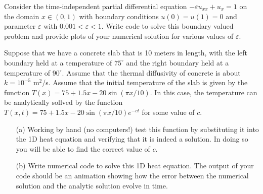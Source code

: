

\begin{problem}
    Consider the time-independent partial differential equation $-\varepsilon u_{xx} +
    u_x = 1$ on the domain $x \in (0,1)$ with boundary conditions $u(0) = u(1) = 0$ and
    parameter $\varepsilon$ with $0.001<\varepsilon<1$.
    Write code to solve this boundary valued problem and provide plots of your numerical
    solution for various values of $\varepsilon$. 
\end{problem}


\begin{problem}
    Suppose that we have a concrete slab that is 10 meters in length, with the left
    boundary held at a temperature of $75^\circ$ and the right boundary held at a
    temperature of $90^\circ$.  Assume that the thermal diffusivity of concrete is about
    $k = 10^{-5}$ m$^2$/s.  Assume that the initial temperature of the slab is given by
    the function $T(x) = 75 + 1.5x - 20 \sin( \pi x / 10)$.  In this case, the temperature
    can be analytically sollved by the function $T(x,t) = 75 + 1.5x - 20 \sin(\pi x / 10)
    e^{-ct}$ for some value of $c$.  
    \begin{enumerate}
        \item[(a)] Working by hand (no computers!) test this function by substituting it
            into the 1D heat equation and verifying that it is indeed a solution.  In
            doing so you will be able to find the correct value of $c$.
        \item[(b)] Write numerical code to solve this 1D heat equation.  The output of
            your code should be an animation showing how the error between the numerical
            solution and the analytic solution evolve in time.
    \end{enumerate}
\end{problem}


